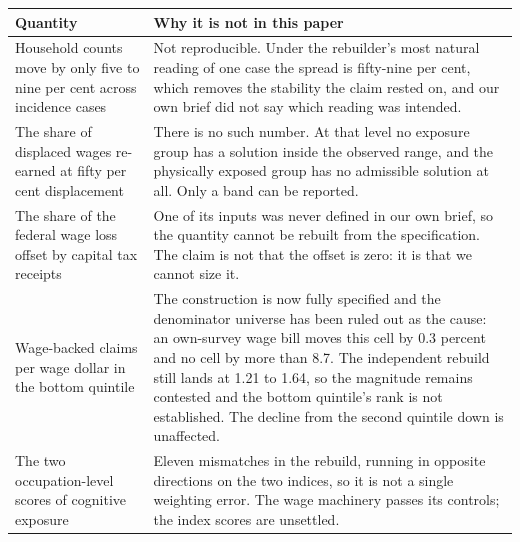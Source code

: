 \begin{tabular}{p{5.6cm}p{9.0cm}}
\toprule
Quantity & Why it is not in this paper \\
\midrule
Household counts move by only five to nine per cent across incidence cases & Not reproducible. Under the rebuilder's most natural reading of one case the spread is fifty-nine per cent, which removes the stability the claim rested on, and our own brief did not say which reading was intended. \\
The share of displaced wages re-earned at fifty per cent displacement & There is no such number. At that level no exposure group has a solution inside the observed range, and the physically exposed group has no admissible solution at all. Only a band can be reported. \\
The share of the federal wage loss offset by capital tax receipts & One of its inputs was never defined in our own brief, so the quantity cannot be rebuilt from the specification. The claim is not that the offset is zero: it is that we cannot size it. \\
Wage-backed claims per wage dollar in the bottom quintile & The construction is now fully specified and the denominator universe has been ruled out as the cause: an own-survey wage bill moves this cell by 0.3 percent and no cell by more than 8.7. The independent rebuild still lands at 1.21 to 1.64, so the magnitude remains contested and the bottom quintile's rank is not established. The decline from the second quintile down is unaffected. \\
The two occupation-level scores of cognitive exposure & Eleven mismatches in the rebuild, running in opposite directions on the two indices, so it is not a single weighting error. The wage machinery passes its controls; the index scores are unsettled. \\
\bottomrule
\end{tabular}

